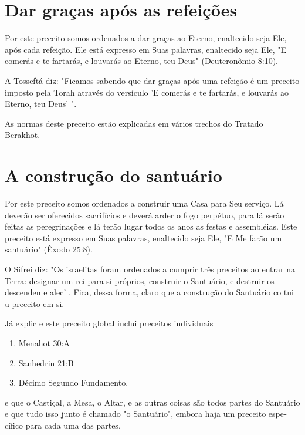 \begin{itemize}
\begin{enumrate}
\begin{itemize}
\begin{itemize}
\section{Dar graças após as refeições}

Por este preceito somos ordenados a dar graças ao Eterno, enalteci­do
seja Ele, após cada refeição. Ele está expresso em Suas palavras,
enaltecido seja Ele, "E comerás e te fartarás, e louvarás ao Eterno, teu
Deus" (Deuteronô­mio 8:10).

A Tosseftá diz: "Ficamos sabendo que dar graças após uma refeição é um
preceito imposto pela Torah através do versículo 'E comerás e te
fartarás, e louvarás ao Eterno, teu Deus' ".

As normas deste preceito estão explicadas em vários trechos do Tra­tado
Berakhot.

\section{A construção do santuário}

Por este preceito somos ordenados a construir uma Casa para Seu serviço.
Lá deverão ser oferecidos sacrifícios e deverá arder o fogo perpétuo,
para lá serão feitas as peregrinações e lá terão lugar todos os anos as
festas e assembléias. Este preceito está expresso em Suas palavras,
enaltecido seja Ele, "E Me farão um santuário" (Êxodo 25:8).

O Sifrei diz: "Os israelitas foram ordenados a cumprir três preceitos ao
entrar na Terra: designar um rei para si próprios, construir o
Santuário, e destruir os descenden e alec' . Fica, dessa forma, claro
que a constru­ção do Santuário co tui u preceito em si.

Já explic e este preceito global inclui preceitos individuais


\begin{enumerate}
\def\labelenumi{\arabic{enumi}.}
\setcounter{enumi}{43}
\item
 
 Menahot 30:A
 
\item
 
 Sanhedrin 21:B
 
\item
 
 Décimo Segundo Fundamento.
 
\end{enumerate}

e que o Castiçal, a Mesa, o Altar, e as outras coisas são todos partes
do Santuário e que tudo isso junto é chamado "o Santuário", embora haja
um preceito espe­cífico para cada uma das partes.


\end{itemize}
\end{itemize}
\end{enumrate}
\end{itemize}
